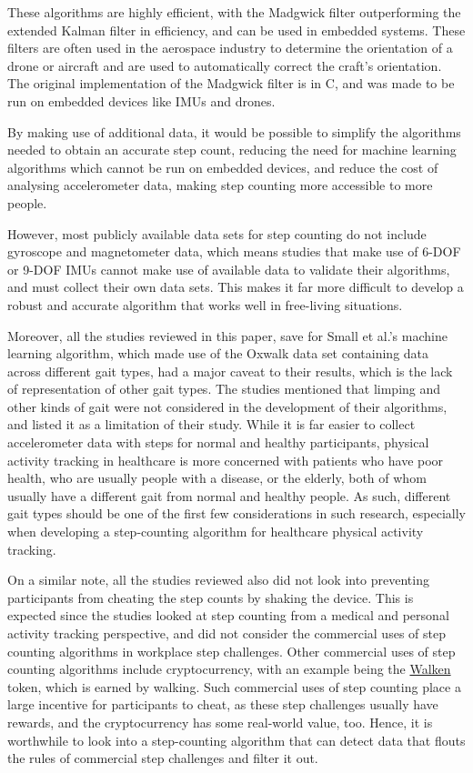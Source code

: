 \documentclass[12pt]{report}
\begin{document}
These algorithms are highly efficient, with the Madgwick
filter outperforming the extended Kalman filter in efficiency,
and can be used in embedded systems.
These filters are often used in the aerospace industry to
determine the orientation of a drone or aircraft
and are used to automatically correct the craft's orientation.
The original implementation of the Madgwick filter is in C,
and was made to be run on embedded devices like IMUs and drones.

By making use of additional data, it would be possible to
simplify the algorithms needed to obtain an accurate step count,
reducing the need for machine learning algorithms which cannot be
run on embedded devices, and reduce the cost of analysing
accelerometer data, making step counting more accessible to more people.

However, most publicly available data sets for step counting do not
include gyroscope and magnetometer data, which means studies that
make use of 6-DOF or 9-DOF IMUs cannot make use of available data
to validate their algorithms, and must collect their own data sets.
This makes it far more difficult to develop a robust and accurate
algorithm that works well in free-living situations.

\clearpage

Moreover, all the studies reviewed in this paper, save for
Small et al.'s machine learning algorithm, which made use of the Oxwalk
data set containing data across different gait types, had a major caveat
to their results, which is the lack of representation of other gait types.
The studies mentioned that limping and other kinds of gait were
not considered in the development of their algorithms, and listed
it as a limitation of their study. While it is far easier to collect
accelerometer data with steps for normal and healthy participants,
physical activity tracking in healthcare is more concerned with
patients who have poor health, who are usually people with a disease,
or the elderly, both of whom usually have a different gait from
normal and healthy people. As such, different gait types should be
one of the first few considerations in such research,
especially when developing a step-counting algorithm for
healthcare physical activity tracking.

On a similar note, all the studies reviewed also did not look into
preventing participants from cheating the step counts by shaking the
device. This is expected since the studies looked at step counting
from a medical and personal activity tracking perspective,
and did not consider the commercial uses of step counting algorithms
in workplace step challenges. Other commercial uses of step
counting algorithms include cryptocurrency, with an example being
the \href{https://walken.io/}{Walken} token, which is earned by walking. Such commercial uses
of step counting place a large incentive for participants to cheat,
as these step challenges usually have rewards, and the cryptocurrency
has some real-world value, too. Hence, it is worthwhile to look into
a step-counting algorithm that can detect data that flouts the rules
of commercial step challenges and filter it out.
\end{document}
